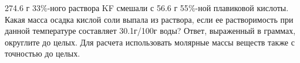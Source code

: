 
274.6
г 33$\%$-ного раствора KF смешали с 56.6 г 55$\%$-ной плавиковой кислоты. Какая
масса осадка кислой соли выпала из раствора, если ее растворимость при данной
температуре составляет 30.1г/100г воды? Ответ, выраженный в граммах, округлите
до целых. Для расчета использовать молярные массы веществ также с точностью до
целых.



